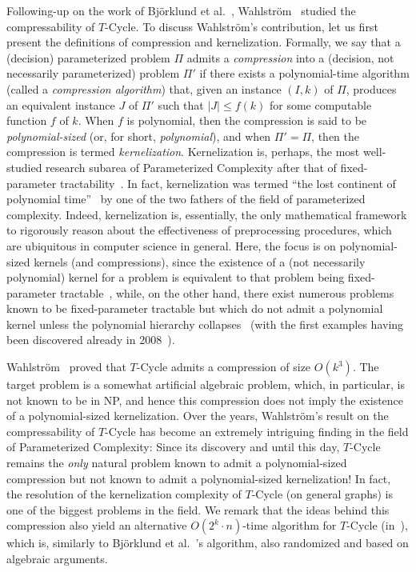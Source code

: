 \documentclass{article}
\numberwithin{claimcounter}{lemma}
\begin{document}
Following-up on the work of Bj\"{o}rklund et al.~\cite{DBLP:conf/soda/BjorklundHT12}, Wahlstr\"{o}m~\cite{DBLP:conf/stacs/Wahlstrom13} studied the compressability of {\sc $T$-Cycle}. To discuss Wahlstr\"{o}m's contribution, let us first present the definitions of compression and kernelization. Formally, we say that a (decision) parameterized problem $\Pi$ admits a {\em compression} into a (decision, not necessarily parameterized) problem $\Pi'$ if there exists a polynomial-time algorithm (called a {\em compression algorithm}) that, given an instance $(I,k)$ of $\Pi$, produces an equivalent instance $J$ of $\Pi'$ such that $|J|\leq f(k)$ for some computable function $f$ of $k$. When $f$ is polynomial, then the compression is said to be {\em polynomial-sized} (or, for short, {\em polynomial}), and when $\Pi'=\Pi$, then the compression is termed {\em kernelization}. Kernelization is, perhaps, the most well-studied research subarea of Parameterized Complexity after that of fixed-parameter tractability~\cite{kernelbook}. In fact, kernelization was termed ``the lost continent of polynomial time''~\cite{DBLP:conf/iwpec/Fellows06} by one of the two fathers of the field of parameterized complexity. Indeed, kernelization is, essentially, the only mathematical framework to rigorously reason about the effectiveness of preprocessing procedures, which are ubiquitous in computer science in general.  Here, the focus is on polynomial-sized kernels (and compressions), since the existence of a (not necessarily polynomial) kernel for a problem is equivalent to that problem being fixed-parameter tractable~\cite{cai1997advice}, while, on the other hand, there exist numerous problems known to be fixed-parameter tractable but which do not admit a polynomial kernel unless the polynomial hierarchy collapses~\cite{kernelbook} (with the first examples having been discovered already in 2008~\cite{DBLP:journals/jcss/BodlaenderDFH09}).

Wahlstr\"{o}m~\cite{DBLP:conf/stacs/Wahlstrom13} proved that {\sc $T$-Cycle} admits a compression of size $O(k^3)$. The target problem is a somewhat artificial algebraic problem, which, in particular, is not known to be in NP, and hence this compression does not imply the existence of a polynomial-sized kernelization. Over the years, Wahlstr\"{o}m's result on the compressability of {\sc $T$-Cycle}  has become an extremely intriguing finding in the field of Parameterized Complexity: Since its discovery and until this day, {\sc $T$-Cycle} remains the {\em only} natural problem known to admit a polynomial-sized compression but not known to admit a polynomial-sized kernelization! In fact, the resolution of the kernelization complexity of {\sc $T$-Cycle}  (on general graphs) is one of the biggest problems in the field.
We remark that the ideas behind this compression also yield an alternative $O(2^k\cdot n)$-time algorithm for {\sc $T$-Cycle} (in~\cite{DBLP:conf/stacs/Wahlstrom13}), which is, similarly to Bj\"{o}rklund et al.~\cite{DBLP:conf/soda/BjorklundHT12}'s algorithm, also randomized and based on algebraic arguments.
\end{document}
